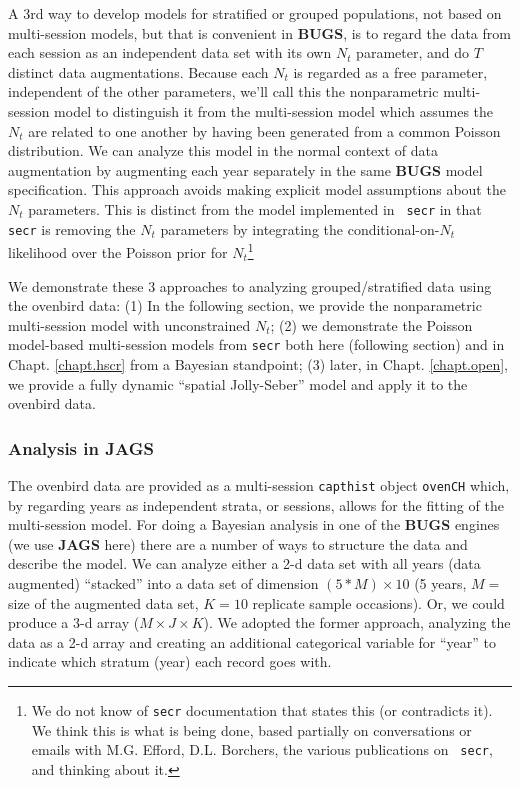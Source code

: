 A 3rd way to develop models for stratified or grouped populations, not
based on multi-session models, but that is convenient in {\bf BUGS},
is to regard the data from each session as an independent data set
with its own $N_{t}$ parameter, and do $T$ distinct data
augmentations. Because each $N_{t}$ is regarded as a free parameter,
independent of the other parameters, we'll call this the nonparametric
multi-session model to distinguish it from the multi-session model
which assumes the $N_{t}$ are related to one another by having been
generated from a common Poisson distribution.  We can analyze this
model in the normal context of data augmentation by augmenting each
year separately in the same {\bf BUGS} model specification. This
approach avoids making explicit model assumptions about the $N_{t}$
parameters.  This is distinct from the model implemented in \mbox{\tt
  secr} in that \mbox{\tt secr} is removing the $N_{t}$ parameters by
integrating the conditional-on-$N_{t}$ likelihood over the Poisson
prior for $N_{t}$\footnote{We do not know of \mbox{\tt secr}
  documentation that states this (or contradicts it). We think this is
  what is being done, based partially on conversations or emails with
M.G. Efford,   D.L. Borchers, the various publications on \mbox{\tt
  secr}, and thinking about it.}

We
demonstrate these 3  approaches to analyzing grouped/stratified data
using the ovenbird data: (1) In the
following section, we provide the nonparametric multi-session model with
unconstrained $N_{t}$; (2) we demonstrate  the Poisson model-based
multi-session models from \mbox{\tt secr} both here (following section) and in
Chapt. \ref{chapt.hscr} from a Bayesian standpoint; (3) 
later, in Chapt. \ref{chapt.open}, we provide a fully dynamic  ``spatial Jolly-Seber''
model and apply it to the ovenbird data.


\subsubsection{Analysis in JAGS}

The ovenbird data are provided as a multi-session \mbox{\tt capthist}
object \mbox{\tt ovenCH} which, by regarding years as independent
strata, or sessions, allows for the fitting of the multi-session model.  For doing
a Bayesian analysis in one of the {\bf BUGS} engines (we use {\bf
  JAGS} here) there are a number of ways to structure the data and
describe the model.  We can analyze either a 2-d data set with all
years (data augmented) ``stacked'' into a data set of dimension $(5*M)
\times 10$ (5 years, $M=$ size of the augmented data set, $K=10$
replicate sample occasions). Or, we could produce a 3-d array ($M \times J
\times K$). We adopted the former approach, analyzing the data as a
2-d array and creating an additional categorical  variable for ``year''
to indicate which stratum (year) each record goes with.  

